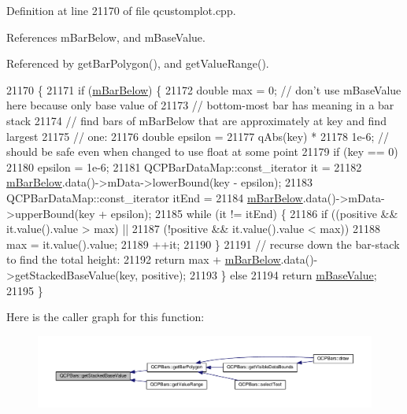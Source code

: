 Definition at line 21170 of file qcustomplot.\+cpp.



References m\+Bar\+Below, and m\+Base\+Value.



Referenced by get\+Bar\+Polygon(), and get\+Value\+Range().


\begin{DoxyCode}
21170                                                                    \{
21171   \textcolor{keywordflow}{if} (\hyperlink{class_q_c_p_bars_ad51db970eed7e286f2753b0216fc56de}{mBarBelow}) \{
21172     \textcolor{keywordtype}{double} max = 0; \textcolor{comment}{// don't use mBaseValue here because only base value of}
21173                     \textcolor{comment}{// bottom-most bar has meaning in a bar stack}
21174     \textcolor{comment}{// find bars of mBarBelow that are approximately at key and find largest}
21175     \textcolor{comment}{// one:}
21176     \textcolor{keywordtype}{double} epsilon =
21177         qAbs(key) *
21178         1e-6; \textcolor{comment}{// should be safe even when changed to use float at some point}
21179     \textcolor{keywordflow}{if} (key == 0)
21180       epsilon = 1e-6;
21181     QCPBarDataMap::const\_iterator it =
21182         \hyperlink{class_q_c_p_bars_ad51db970eed7e286f2753b0216fc56de}{mBarBelow}.data()->mData->lowerBound(key - epsilon);
21183     QCPBarDataMap::const\_iterator itEnd =
21184         \hyperlink{class_q_c_p_bars_ad51db970eed7e286f2753b0216fc56de}{mBarBelow}.data()->mData->upperBound(key + epsilon);
21185     \textcolor{keywordflow}{while} (it != itEnd) \{
21186       \textcolor{keywordflow}{if} ((positive && it.value().value > max) ||
21187           (!positive && it.value().value < max))
21188         max = it.value().value;
21189       ++it;
21190     \}
21191     \textcolor{comment}{// recurse down the bar-stack to find the total height:}
21192     \textcolor{keywordflow}{return} max + \hyperlink{class_q_c_p_bars_ad51db970eed7e286f2753b0216fc56de}{mBarBelow}.data()->getStackedBaseValue(key, positive);
21193   \} \textcolor{keywordflow}{else}
21194     \textcolor{keywordflow}{return} \hyperlink{class_q_c_p_bars_aa0515cf47fa6044cc28e59b1ae5ec759}{mBaseValue};
21195 \}
\end{DoxyCode}


Here is the caller graph for this function\+:\nopagebreak
\begin{figure}[H]
\begin{center}
\leavevmode
\includegraphics[width=350pt]{class_q_c_p_bars_ae9b0c2fad9f29030c84bb6e62a4b605f_icgraph}
\end{center}
\end{figure}



